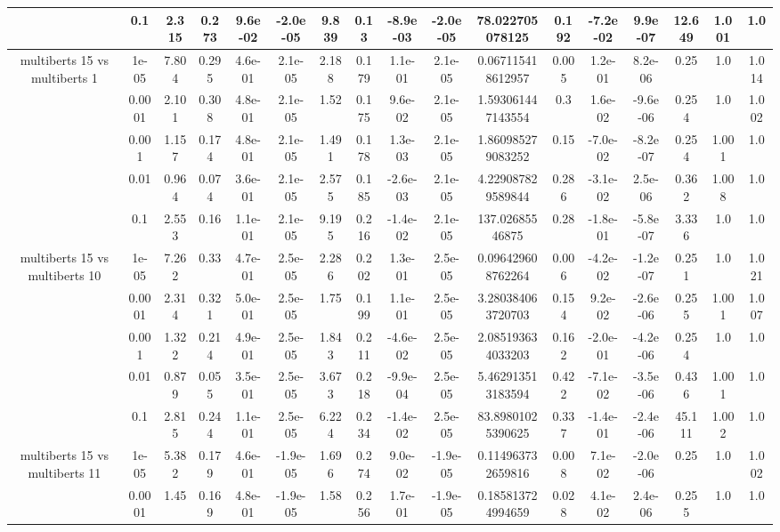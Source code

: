 \begin{tabular}{|c|c|c|c|c|c|c|c|c|c|c|c|c|c|c|c|c|}
 & 0.1 & 2.315 & 0.273 & 9.6e-02 & -2.0e-05 & 9.839 & 0.13 & -8.9e-03 & -2.0e-05 & 78.022705078125 & 0.192 & -7.2e-02 & 9.9e-07 & 12.649 & 1.001 & 1.0 \\
\hline
\multirow{5}{*}{multiberts 15 vs multiberts 1} & 1e-05 & 7.804 & 0.295 & 4.6e-01 & 2.1e-05 & 2.188 & 0.179 & 1.1e-01 & 2.1e-05 & 0.067115418612957 & 0.005 & 1.2e-01 & 8.2e-06 & 0.25 & 1.0 & 1.014 \\
 & 0.0001 & 2.101 & 0.308 & 4.8e-01 & 2.1e-05 & 1.52 & 0.175 & 9.6e-02 & 2.1e-05 & 1.593061447143554 & 0.3 & 1.6e-02 & -9.6e-06 & 0.254 & 1.0 & 1.002 \\
 & 0.001 & 1.157 & 0.174 & 4.8e-01 & 2.1e-05 & 1.491 & 0.178 & 1.3e-03 & 2.1e-05 & 1.860985279083252 & 0.15 & -7.0e-02 & -8.2e-07 & 0.254 & 1.001 & 1.0 \\
 & 0.01 & 0.964 & 0.074 & 3.6e-01 & 2.1e-05 & 2.575 & 0.185 & -2.6e-03 & 2.1e-05 & 4.229087829589844 & 0.286 & -3.1e-02 & 2.5e-06 & 0.362 & 1.008 & 1.0 \\
 & 0.1 & 2.553 & 0.16 & 1.1e-01 & 2.1e-05 & 9.195 & 0.216 & -1.4e-02 & 2.1e-05 & 137.02685546875 & 0.28 & -1.8e-01 & -5.8e-07 & 3.336 & 1.0 & 1.0 \\
\hline
\multirow{5}{*}{multiberts 15 vs multiberts 10} & 1e-05 & 7.262 & 0.33 & 4.7e-01 & 2.5e-05 & 2.286 & 0.202 & 1.3e-01 & 2.5e-05 & 0.096429608762264 & 0.006 & -4.2e-02 & -1.2e-07 & 0.251 & 1.0 & 1.021 \\
 & 0.0001 & 2.314 & 0.321 & 5.0e-01 & 2.5e-05 & 1.75 & 0.199 & 1.1e-01 & 2.5e-05 & 3.280384063720703 & 0.154 & 9.2e-02 & -2.6e-06 & 0.255 & 1.001 & 1.007 \\
 & 0.001 & 1.322 & 0.214 & 4.9e-01 & 2.5e-05 & 1.843 & 0.211 & -4.6e-02 & 2.5e-05 & 2.085193634033203 & 0.162 & -2.0e-01 & -4.2e-06 & 0.254 & 1.0 & 1.0 \\
 & 0.01 & 0.879 & 0.055 & 3.5e-01 & 2.5e-05 & 3.673 & 0.218 & -9.9e-04 & 2.5e-05 & 5.462913513183594 & 0.422 & -7.1e-02 & -3.5e-06 & 0.436 & 1.001 & 1.0 \\
 & 0.1 & 2.815 & 0.244 & 1.1e-01 & 2.5e-05 & 6.224 & 0.234 & -1.4e-02 & 2.5e-05 & 83.89801025390625 & 0.337 & -1.4e-01 & -2.4e-06 & 45.111 & 1.002 & 1.0 \\
\hline
\multirow{5}{*}{multiberts 15 vs multiberts 11} & 1e-05 & 5.382 & 0.179 & 4.6e-01 & -1.9e-05 & 1.696 & 0.274 & 9.0e-02 & -1.9e-05 & 0.114963732659816 & 0.008 & 7.1e-02 & -2.0e-06 & 0.25 & 1.0 & 1.002 \\
 & 0.0001 & 1.45 & 0.169 & 4.8e-01 & -1.9e-05 & 1.58 & 0.256 & 1.7e-01 & -1.9e-05 & 0.185813724994659 & 0.028 & 4.1e-02 & 2.4e-06 & 0.255 & 1.0 & 1.0 \\

\end{tabular}
